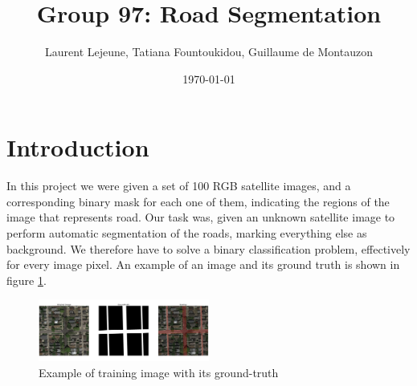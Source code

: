 \documentclass[10pt,conference,compsocconf]{IEEEtran}
\author{Laurent Lejeune, Tatiana Fountoukidou, Guillaume de Montauzon}
\date{\today}
\title{Group 97: Road Segmentation}
\begin{document}
	
	\maketitle
	
	\section{Introduction}
	In this project we were given a set of 100 RGB satellite images, and a
  corresponding binary mask for each one of them, indicating the regions of the
  image that represents road. Our task was, given an unknown satellite image to
  perform automatic segmentation of the roads, marking everything else as
  background. We therefore have to solve a binary classification problem,
  effectively for every image pixel. An example of an image and its ground truth
  is shown in figure \ref{fig:example}.
	\begin{figure}[h]
		\centering
		\includegraphics[width=0.5\textwidth]{pics/example.png}
		\caption{Example of training image with its ground-truth}
		\label{fig:example}
	\end{figure}
	
	
\end{document}
